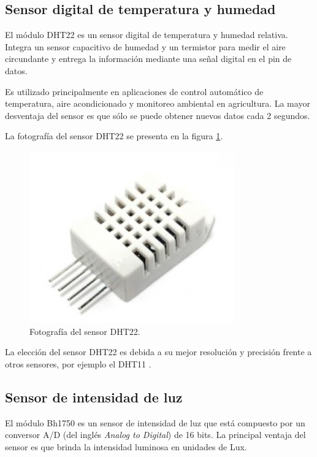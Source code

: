 \subsection{Sensor digital de temperatura y humedad}

El módulo DHT22 \citep{WEBSITE:DHT22} es un sensor digital de temperatura y humedad relativa. Integra un sensor capacitivo de humedad y un termistor \citep{WEBSITE:TERMISTOR} para medir el aire circundante y entrega la información mediante una señal digital en el pin de datos. 

Es utilizado principalmente en aplicaciones de control automático de temperatura, aire acondicionado y monitoreo ambiental en agricultura. La mayor desventaja del sensor es que sólo se puede obtener nuevos datos cada 2 segundos. 

La fotografía del sensor DHT22 se presenta en la figura \ref{fig:fotografiaDHT22}.

\begin{figure}[H]
	\centering
	\includegraphics[width=.4\textwidth]{./Figures/DHT22.jpg}
	\caption{Fotografía del sensor DHT22\protect\footnotemark.}
	\label{fig:fotografiaDHT22}
\end{figure}


La elección del sensor DHT22 es debida a su mejor resolución y precisión frente a otros sensores, por ejemplo el DHT11 \citep{WEBSITE:DHT11}.


\subsection{Sensor de intensidad de luz}

El módulo Bh1750 \citep{WEBSITE:BH1750} es un sensor de intensidad de luz que está compuesto por un conversor A/D (del inglés \textit{Analog to Digital}) \citep{WEBSITE:CONVERSORAD} de 16 bits. La principal ventaja del sensor es que brinda la intensidad luminosa en unidades de Lux.

